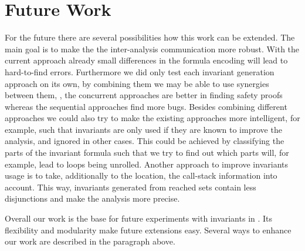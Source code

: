 \section{Future Work}
For the future there are several possibilities how this work can be extended. The main goal is to make the the inter-analysis communication more robust. With the current approach already small differences 
in the formula encoding will lead to hard-to-find errors. Furthermore we did only test each invariant generation approach on its own, by combining them we may be able to use synergies between them, \eg, 
the concurrent approaches are better in finding safety proofs whereas the sequential approaches find more bugs.
Besides combining different approaches we could also try to make the existing approaches more intelligent, for example, such that invariants are only used if they are known to improve the analysis, and 
ignored in other cases. This could be achieved by classifying the parts of the invariant formula such that we try to find out which parts will, for example, lead to loops being unrolled. Another approach to 
improve invariants usage is to take, additionally to the location, the call-stack information into account. This way, invariants generated from reached sets contain less disjunctions and make the analysis more 
precise.

Overall our work is the base for future experiments with invariants in \CPAchecker{}. Its flexibility and modularity make future extensions easy. Several ways to enhance our work are described in the paragraph above.